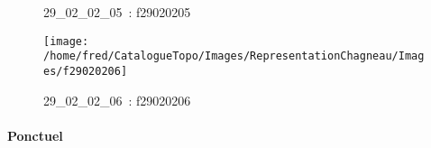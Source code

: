 \documentclass[12pt,titlepage]{book}
\begin{document}
\begin{figure}[h!]
\begin{minipage}[t]{3cm}
\begin{center}
      \caption[~29\_02\_02\_05]{\small{29\_02\_02\_05~:} \tiny{f29020205}}\label{f29020205}
    \end{center}
  \end{minipage}
  \begin{minipage}[t]{3cm}
    \begin{center}
      \texttt{[image: /home/fred/CatalogueTopo/Images/RepresentationChagneau/Images/f29020206]}
      \caption[~29\_02\_02\_06]{\small{29\_02\_02\_06~:} \tiny{f29020206}}\label{f29020206}
    \end{center}
  \end{minipage}
\end{figure}


\paragraph{Ponctuel}
\noindent
\vspace{\baselineskip}
\end{document}
